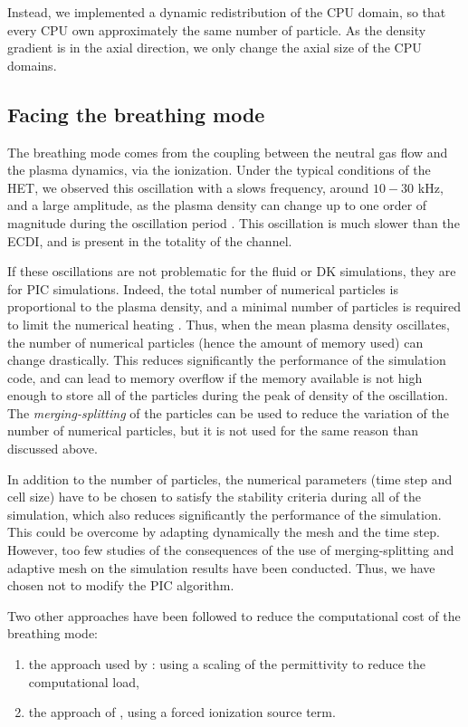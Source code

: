 Instead, we implemented a dynamic redistribution of the CPU domain, so that every CPU own approximately the same number of particle.
As the density gradient is in the axial direction, we only change the axial size of the CPU domains.



\subsection{Facing the breathing mode} \label{subsec-breathmod}
The breathing mode comes from the coupling between the neutral gas flow and the plasma dynamics, via the ionization.
Under the typical conditions of the \ac{HET}, we observed this oscillation with a slows frequency, around  $10-30$ kHz, and a large amplitude, as the plasma density can change up to one order of magnitude during the oscillation period \citep{barral2003a,barral2009}.
This oscillation is much slower than the \ac{ECDI}, and is present in the totality of the channel.

If these oscillations are not problematic for the fluid or \ac{DK} simulations, they are for \ac{PIC} simulations.
Indeed, the total number of numerical particles is proportional to the plasma density, and a minimal number of particles is required to limit the numerical heating \citep{turner2006}.
Thus, when the mean plasma density oscillates, the number of numerical particles (hence the amount of memory used) can change drastically.
This reduces significantly the performance of the simulation code, and can lead to memory overflow if the memory available is not high enough to store all of the particles during the peak of density  of the oscillation.
The \emph{merging-splitting} of the particles  can be used to reduce the variation of the number of numerical particles, but it is not used for the same reason than discussed above.

In addition to the number of particles, the numerical parameters (time step and cell size) have to be chosen to satisfy the stability criteria during all of the simulation, which also reduces significantly the performance of the simulation. 
This could be overcome by adapting dynamically the mesh and the time step.
However, too few studies of the consequences of the use of merging-splitting and adaptive mesh on the simulation results have been conducted.
Thus, we have chosen not to modify the \ac{PIC} algorithm.


Two other approaches have been followed to reduce the computational cost of the breathing mode\string:
\begin{enumerate}
  \item the approach used by \citet{coche2014}\string: using a scaling of the permittivity to reduce the computational load,
  \item the approach of \citet{boeuf2017}, using a forced ionization source term.
\end{enumerate} 

